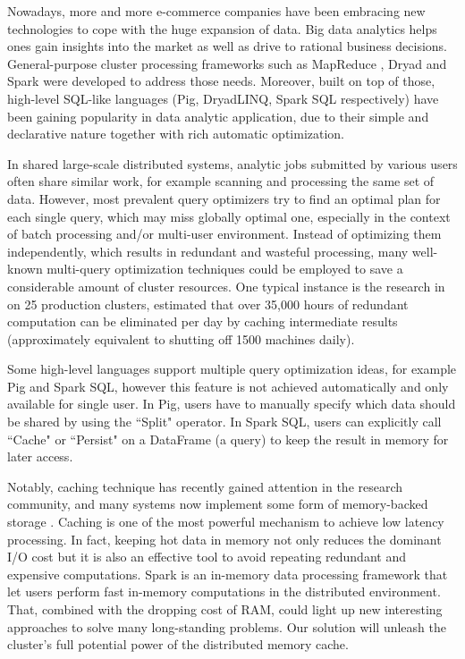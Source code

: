 Nowadays, more and more e-commerce companies have been embracing new technologies to cope with the huge expansion of data. Big data analytics helps ones gain insights into the market as well as drive to rational business decisions. General-purpose cluster processing frameworks such as MapReduce \cite{dean2008mapreduce}, Dryad \cite{isard2007dryad} and Spark \cite{zaharia2012resilient} were developed to address those needs. Moreover, built on top of those, high-level SQL-like languages (Pig, DryadLINQ, Spark SQL respectively) have been gaining popularity in data analytic application, due to their simple and declarative nature together with rich automatic optimization.

In shared large-scale distributed systems, analytic jobs submitted by various users often share similar work, for example scanning and processing the same set of data. However, most prevalent query optimizers try to find an optimal plan for each single query, which may miss globally optimal one, especially in the context of batch processing and/or multi-user environment. Instead of optimizing them independently, which results in redundant and wasteful processing, many well-known multi-query optimization techniques could be employed to save a considerable amount of cluster resources. One typical instance is the research in \cite{gunda2010nectar} on 25 production clusters, estimated that over 35,000 hours of redundant computation can be eliminated per day by caching intermediate results (approximately equivalent to shutting off 1500 machines daily).

Some high-level languages support multiple query optimization ideas, for example Pig and Spark SQL, however this feature is not achieved automatically and only available for single user. In Pig, users have to manually specify which data should be shared by using the ``Split" operator. In Spark SQL, users can explicitly call ``Cache" or ``Persist" on a DataFrame (a query) to keep the result in memory for later access.

Notably, caching technique has recently gained attention in the research community, and many systems now implement some form of memory-backed storage \cite{tachyon, hdfs}. Caching is one of the most powerful mechanism to achieve low latency processing. In fact, keeping hot data in memory not only reduces the dominant I/O cost but it is also an effective tool to avoid repeating redundant and expensive computations. Spark is an in-memory data processing framework that let users perform fast in-memory computations in the distributed environment. That, combined with the dropping cost of RAM, could light up new interesting approaches to solve many long-standing problems. Our solution will unleash the cluster's full potential power of the distributed memory cache.


